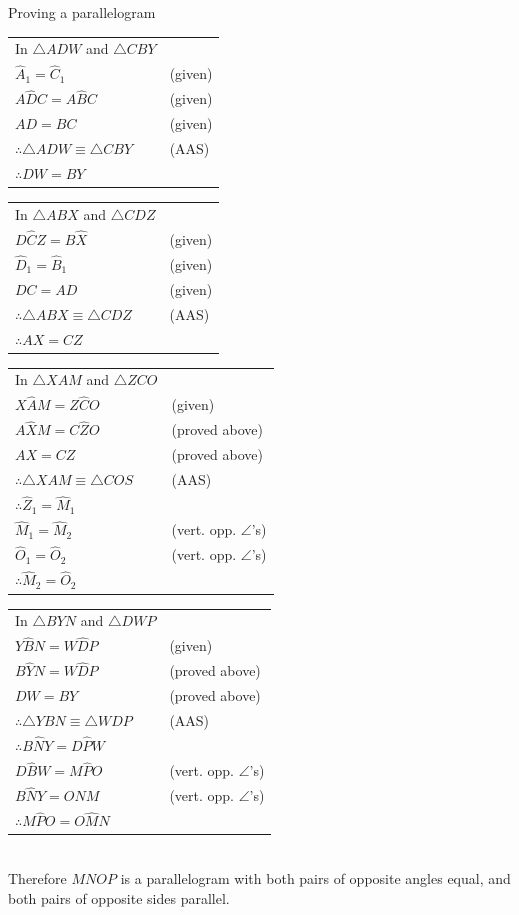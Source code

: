 \begin{wex}{Proving a parallelogram}
{} 
{
\begin{tabular}{ll}
In $\triangle ADW$ and $\triangle{CBY}$ & \\
$\hat{A}_{1} = \hat{C}_{1}$ & (given) \\
$A\hat{D}C = A\hat{B}C$ & (given) \\
$AD =BC$ & (given) \\ 
$\therefore \triangle ADW \equiv \triangle CBY$ & (AAS) \\
$\therefore DW = BY$ & \\
\end{tabular}
\begin{tabular}{ll}
In $\triangle ABX$ and $\triangle CDZ$ & \\
$D\hat{C}Z = B\hat{X}$ & (given) \\
$\hat{D}_{1} = \hat{B}_{1}$ & (given) \\
$DC = AD$ & (given) \\
$\therefore \triangle ABX \equiv \triangle CDZ$ & (AAS) \\ 
$\therefore AX = CZ$  & \\
\end{tabular}
\begin{tabular}{ll}
In $\triangle XAM$ and $\triangle ZCO$ & \\
$X\hat{A}M = Z\hat{C}O$ & (given) \\
$A\hat{X}M = C\hat{Z}O$ & (proved above) \\
$AX = CZ$ & (proved above) \\
$\therefore \triangle XAM \equiv \triangle COS$ & (AAS) \\
$\therefore \hat{Z}_{1} = \hat{M}_{1}$ & \\
$\hat{M}_1 = \hat{M}_2$ & (vert. opp. $\angle$'s) \\
$\hat{O}_{1} = \hat{O}_2$ & (vert. opp. $\angle$'s) \\
$\therefore \hat{M}_2 = \hat{O}_{2}$ & \\
\end{tabular}
\begin{tabular}{ll}
In $\triangle BYN$ and $\triangle DWP$ & \\
$Y\hat{B}N = W\hat{D}P$ & (given) \\
$B\hat{Y}N = W\hat{D}P$ & (proved above) \\
$DW = BY$ & (proved above) \\
$\therefore \triangle YBN \equiv \triangle WDP$ & (AAS) \\
$\therefore B\hat{N}Y = D\hat{P}W$ & \\
$D\hat{B}W = M\hat{P}O$ & (vert. opp. $\angle$'s) \\
$B\hat{N}Y = O\hat{N}M$ & (vert. opp. $\angle$'s) \\
$\therefore M\hat{P}O = O\hat{M}N$ & \\
\end{tabular}\\
Therefore $MNOP$ is a parallelogram with both pairs of opposite angles equal, and both pairs of opposite sides parallel.
}
\end{wex}


